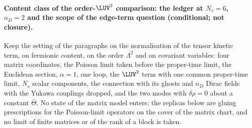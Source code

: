 \paragraph{Content class of the order-\(\LUV^2\) comparison: the ledger at \(N_s=6\), \(n_D=2\) and the scope of the edge-term question (conditional; not closure).}
Keep the setting of the paragraphs on the normalisation of the tensor kinetic term, on fermionic content, on the order \(\Lambda^2\) and on covariant variables: four matrix coordinates, the Poisson limit taken before the proper-time limit, the Euclidean section, \(\alpha=1\), one loop, the \(\LUV^2\) term with one common proper-time limit, \(N_s\) scalar components, the connection with its ghosts and \(n_D\) Dirac fields with the Yukawa couplings dropped, and the two modes with \(\delta\rho=0\) about a constant \(\bar\Theta\). No state of the matrix model enters: the replicas below are gluing prescriptions for the Poisson-limit operators on the cover of the matrix chart, and no limit of finite matrices or of the rank of a block is taken.

